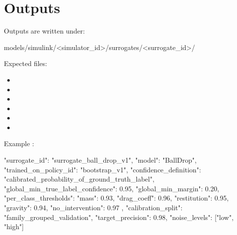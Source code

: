 \documentclass[11pt]{article}
\begin{document}
\section*{Outputs}

Outputs are written under:

\begin{DocCode}
models/simulink/<simulator_id>/surrogates/<surrogate_id>/
\end{DocCode}

Expected files:

\begin{itemize}
\item {}
\item {}
\item {}
\item {}
\item {}
\item {}
\end{itemize}

Example :

\begin{DocCode}
{
  "surrogate_id": "surrogate_ball_drop_v1",
  "model": "BallDrop",
  "trained_on_policy_id": "bootstrap_v1",
  "confidence_definition": "calibrated_probability_of_ground_truth_label",
  "global_min_true_label_confidence": 0.95,
  "global_min_margin": 0.20,
  "per_class_thresholds": {
    "mass": 0.93,
    "drag_coeff": 0.96,
    "restitution": 0.95,
    "gravity": 0.94,
    "no_intervention": 0.97
  },
  "calibration_split": "family_grouped_validation",
  "target_precision": 0.98,
  "noise_levels": ["low", "high"]
}
\end{DocCode}
\end{document}
